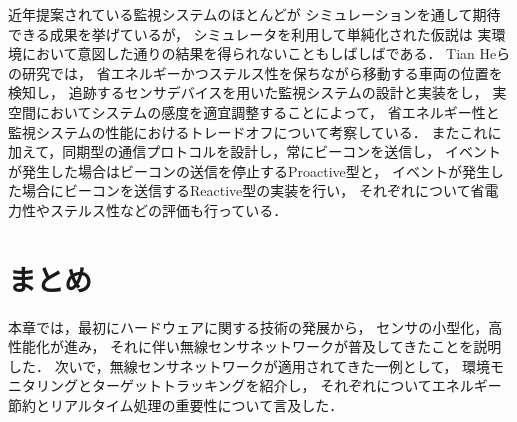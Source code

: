 近年提案されている監視システムのほとんどが
シミュレーションを通して期待できる成果を挙げているが，
シミュレータを利用して単純化された仮説は
実環境において意図した通りの結果を得られないこともしばしばである．
Tian Heらの研究\cite{He04energy-efficientsurveillance}では，
省エネルギーかつステルス性を保ちながら移動する車両の位置を検知し，
追跡するセンサデバイスを用いた監視システムの設計と実装をし，
実空間においてシステムの感度を適宜調整することによって，
省エネルギー性と監視システムの性能におけるトレードオフについて考察している．
またこれに加えて，同期型の通信プロトコルを設計し，常にビーコンを送信し，
イベントが発生した場合はビーコンの送信を停止するProactive型と，
イベントが発生した場合にビーコンを送信するReactive型の実装を行い，
それぞれについて省電力性やステルス性などの評価も行っている．











\section{まとめ}
本章では，最初にハードウェアに関する技術の発展から，
センサの小型化，高性能化が進み，
それに伴い無線センサネットワークが普及してきたことを説明した．
次いで，無線センサネットワークが適用されてきた一例として，
環境モニタリングとターゲットトラッキングを紹介し，
それぞれについてエネルギー節約とリアルタイム処理の重要性について言及した．

